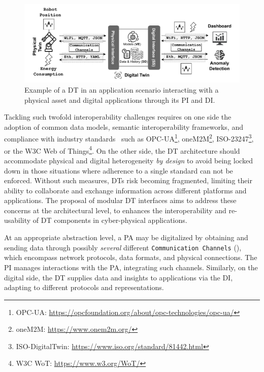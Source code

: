 \begin{figure}[t]
    \centering
    \includegraphics[width=\columnwidth]{figures/dt_application_example.pdf}
    \caption{Example of a DT in an application scenario interacting with a physical asset and digital applications through its PI and DI.}
    \label{fig:dt_application_example}
\end{figure}


Tackling such twofold interoperability challenges requires on one side
the adoption of common data models, semantic interoperability frameworks, and compliance with industry standards~\cite{etsi-dt-comm-requirements-2024} such as OPC-UA\footnote{OPC-UA: \url{https://opcfoundation.org/about/opc-technologies/opc-ua/}}, oneM2M\footnote{oneM2M: \url{https://www.onem2m.org/}}, ISO-23247\footnote{ISO-DigitalTwin: \url{https://www.iso.org/standard/81442.html}}, or the W3C Web of Things\footnote{W3C WoT: \url{https://www.w3.org/WoT/}}.
%
On the other side, the \ac{DT} architecture should accommodate physical and digital heterogeneity \emph{by design} to avoid being locked down in those situations where adherence to a single standard can not be enforced.
Without such measures, \acp{DT} risk becoming fragmented, limiting their ability to collaborate and exchange information across different platforms and applications.
%
The proposal of modular \ac{DT} interfaces aims to address these concerns
at the architectural level, to enhances the interoperability and re-usability of \ac{DT} components in cyber-physical applications.

At an appropriate abstraction level, a \ac{PA} may be digitalized by obtaining and sending data through possibly \emph{several} different \texttt{Communication Channels} (), which 
encompass network protocols, data formats, and physical connections.
The \ac{PI} manages interactions with the \ac{PA}, integrating such channels.
%
Similarly, on the digital side, the \ac{DT} supplies data and insights to applications via the \ac{DI}, adapting to different protocols and representations.

